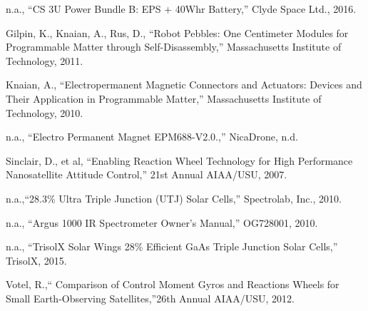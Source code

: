\documentclass[nocover]            %
{CSLI}                       %
\begin{document}
\begin{thebibliography}{}

 n.a., ``CS 3U Power Bundle B: EPS + 40Whr Battery,'' Clyde Space Ltd., 2016.

 Gilpin, K., Knaian, A., Rus, D., ``Robot Pebbles: One Centimeter Modules for Programmable Matter through Self-Disassembly,'' Massachusetts Institute of Technology, 2011.

 Knaian, A., ``Electropermanent Magnetic Connectors and Actuators: Devices and Their Application in Programmable Matter,'' Massachusetts Institute of Technology, 2010.

 n.a., ``Electro Permanent Magnet EPM688-V2.0.,'' NicaDrone, n.d.

 Sinclair, D., et al, ``Enabling Reaction Wheel Technology for High Performance Nanosatellite Attitude Control,'' 21st Annual AIAA/USU, 2007.

 n.a.,``28.3\% Ultra Triple Junction (UTJ) Solar Cells,'' Spectrolab, Inc., 2010.

 n.a., ``Argus 1000 IR Spectrometer Owner's Manual,'' OG728001, 2010.

 n.a., ``TrisolX Solar Wings 28\% Efficient GaAs Triple Junction Solar Cells,'' TrisolX, 2015.

 Votel, R.,`` Comparison of Control Moment Gyros and Reactions Wheels for Small Earth-Observing Satellites,''26th Annual AIAA/USU, 2012.

\end{thebibliography}
\end{document}
